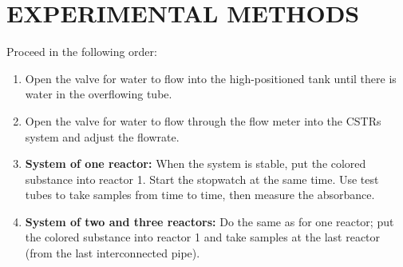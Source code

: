 \section{EXPERIMENTAL METHODS}
Proceed in the following order:
\begin{enumerate}
    \item Open the valve for water to flow into the high-positioned tank until there is water in the overflowing tube.
    \item Open the valve for water to flow through the flow meter into the CSTRs system and adjust the flowrate.
    \item \textbf{System of one reactor:} When the system is stable, put the colored substance into reactor 1. Start the stopwatch at the same time. Use test tubes to take samples from time to time, then measure the absorbance.
    \item \textbf{System of two and three reactors:} Do the same as for one reactor; put the colored substance into reactor 1 and take samples at the last reactor (from the last interconnected pipe).
\end{enumerate}
